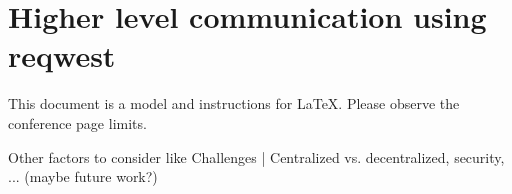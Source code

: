 
\section{Higher level communication using reqwest}
This document is a model and instructions for LaTeX.
Please observe the conference page limits.

Other factors to consider like Challenges | Centralized vs. decentralized, security, ... (maybe future work?)

